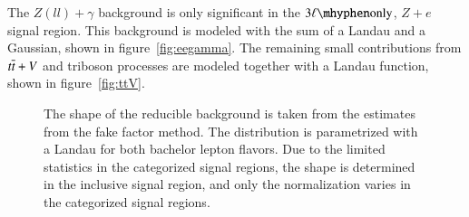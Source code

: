 The $Z(ll)+\gamma$ background is only significant in the $\threelo$, $Z+e$ signal region. This background is modeled with the sum of a Landau and a Gaussian, shown in figure~\ref{fig:eegamma}. The remaining small contributions from $t\overline{t}+V$ and triboson processes are modeled together with a Landau function, shown in figure~\ref{fig:ttV}. 


\begin{figure}[htbp]
    \centering
	\caption{The shape of the reducible background is taken from the estimates from the fake factor method. The distribution is parametrized with a Landau for both bachelor lepton flavors. Due to the limited statistics in the categorized signal regions, the shape is determined in the inclusive signal region, and only the normalization varies in the categorized signal regions.}
	\label{fig:reducible-landau-fits}
\end{figure}


